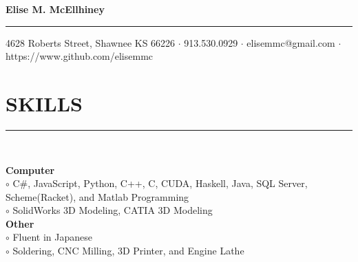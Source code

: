 \documentclass[twoside]{article}
\begin{document}
\begingroup
	\fontsize{20pt}{12pt}\selectfont
	\textbf{Elise M. McEllhiney}\\
\endgroup
\rule{\textwidth}{1.5pt}
\begin{center}
\vspace{-0.6em}
\small{4628 Roberts Street, Shawnee KS 66226 $\cdot$ 913.530.0929 $\cdot$ elisemmc@gmail.com $\cdot$ https://www.github.com/elisemmc}
\end{center}

\fontsize{9pt}{10.5pt}\selectfont

\section*{SKILLS}
\vspace{-1em}
\rule{\textwidth}{1pt}\\
\begin{adjustwidth}{0.2in}{0in}
\vspace{-1em}
\textbf{Computer}\\
$\circ$ C\#, JavaScript, Python, C++, C, CUDA, Haskell, Java, SQL Server, Scheme(Racket), and Matlab Programming\\
$\circ$ SolidWorks 3D Modeling, CATIA 3D Modeling\\
\textbf{Other}\\
$\circ$ Fluent in Japanese\\
$\circ$ Soldering, CNC Milling, 3D Printer, and Engine Lathe\\
\end{adjustwidth}
\end{document}

